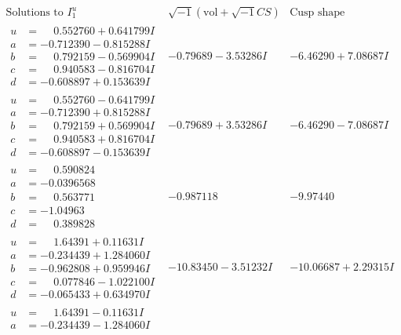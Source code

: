 \documentclass[1p]{elsarticle_modified}
\theoremstyle{definition}
\newcommand{\I}{\sqrt{-1}}
\begin{document}
$$\begin{array}{c|c|c}  
\text{Solutions to }I^u_{1}& \I (\text{vol} + \sqrt{-1}CS) & \text{Cusp shape}\\
 \hline 
\begin{aligned}
u &= \phantom{-}0.552760 + 0.641799 I \\
a &= -0.712390 - 0.815288 I \\
b &= \phantom{-}0.792159 - 0.569904 I \\
c &= \phantom{-}0.940583 - 0.816704 I \\
d &= -0.608897 + 0.153639 I\end{aligned}
 & -0.79689 - 3.53286 I & -6.46290 + 7.08687 I \\ \hline\begin{aligned}
u &= \phantom{-}0.552760 - 0.641799 I \\
a &= -0.712390 + 0.815288 I \\
b &= \phantom{-}0.792159 + 0.569904 I \\
c &= \phantom{-}0.940583 + 0.816704 I \\
d &= -0.608897 - 0.153639 I\end{aligned}
 & -0.79689 + 3.53286 I & -6.46290 - 7.08687 I \\ \hline\begin{aligned}
u &= \phantom{-}0.590824\phantom{ +0.000000I} \\
a &= -0.0396568\phantom{ +0.000000I} \\
b &= \phantom{-}0.563771\phantom{ +0.000000I} \\
c &= -1.04963\phantom{ +0.000000I} \\
d &= \phantom{-}0.389828\phantom{ +0.000000I}\end{aligned}
 & -0.987118\phantom{ +0.000000I} & -9.97440\phantom{ +0.000000I} \\ \hline\begin{aligned}
u &= \phantom{-}1.64391 + 0.11631 I \\
a &= -0.234439 + 1.284060 I \\
b &= -0.962808 + 0.959946 I \\
c &= \phantom{-}0.077846 - 1.022100 I \\
d &= -0.065433 + 0.634970 I\end{aligned}
 & -10.83450 - 3.51232 I & -10.06687 + 2.29315 I \\ \hline\begin{aligned}
u &= \phantom{-}1.64391 - 0.11631 I \\
a &= -0.234439 - 1.284060 I \\

\end{aligned}
\end{array}$$
\end{document}
